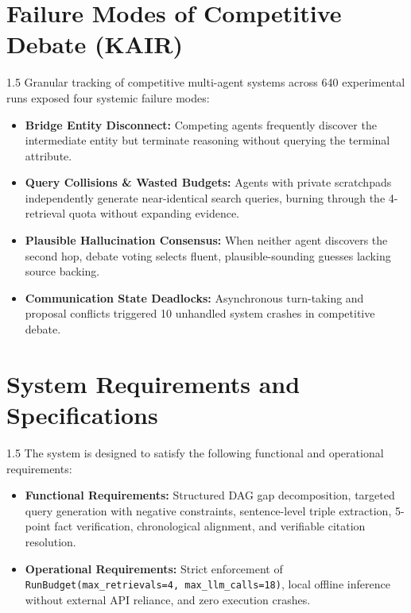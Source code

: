 \documentclass[12pt,a4paper]{report}
\begin{document}
\section{Failure Modes of Competitive Debate (KAIR)}
\begin{spacing}{1.5}
Granular tracking of competitive multi-agent systems across 640 experimental runs exposed four systemic failure modes:
\begin{itemize}
    \item \textbf{Bridge Entity Disconnect:} Competing agents frequently discover the intermediate entity but terminate reasoning without querying the terminal attribute.
    \item \textbf{Query Collisions \& Wasted Budgets:} Agents with private scratchpads independently generate near-identical search queries, burning through the 4-retrieval quota without expanding evidence.
    \item \textbf{Plausible Hallucination Consensus:} When neither agent discovers the second hop, debate voting selects fluent, plausible-sounding guesses lacking source backing.
    \item \textbf{Communication State Deadlocks:} Asynchronous turn-taking and proposal conflicts triggered 10 unhandled system crashes in competitive debate.
\end{itemize}
\end{spacing}

\section{System Requirements and Specifications}
\begin{spacing}{1.5}
The system is designed to satisfy the following functional and operational requirements:
\begin{itemize}
    \item \textbf{Functional Requirements:} Structured DAG gap decomposition, targeted query generation with negative constraints, sentence-level triple extraction, 5-point fact verification, chronological alignment, and verifiable citation resolution.
    \item \textbf{Operational Requirements:} Strict enforcement of \texttt{RunBudget(max\_retrievals=4, max\_llm\_calls=18)}, local offline inference without external API reliance, and zero execution crashes.
\end{itemize}
\end{spacing}

\end{document}
